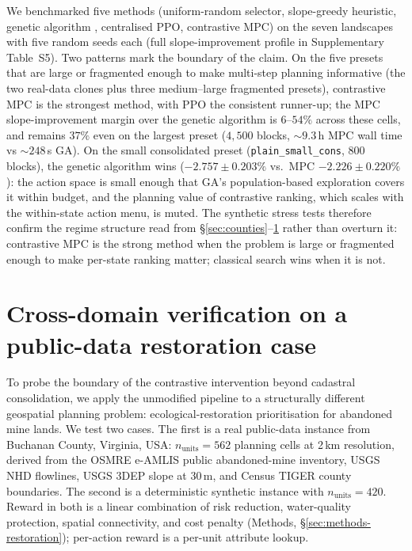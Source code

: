 \documentclass[11pt]{article}
\begin{document}
We benchmarked five methods (uniform-random selector, slope-greedy heuristic, genetic algorithm \citep{cao2012boundary}, centralised PPO, contrastive MPC) on the seven landscapes with five random seeds each (full slope-improvement profile in Supplementary Table~S5). Two patterns mark the boundary of the claim. On the five presets that are large or fragmented enough to make multi-step planning informative (the two real-data clones plus three medium--large fragmented presets), contrastive MPC is the strongest method, with PPO the consistent runner-up; the MPC slope-improvement margin over the genetic algorithm is $6$--$54\%$ across these cells, and remains $37\%$ even on the largest preset ($4{,}500$ blocks, $\sim$$9.3$\,h MPC wall time vs $\sim$$248$\,s GA). On the small consolidated preset (\texttt{plain\_small\_cons}, $800$ blocks), the genetic algorithm wins ($-2.757 \pm 0.203\%$ vs.\ MPC $-2.226 \pm 0.220\%$): the action space is small enough that GA's population-based exploration covers it within budget, and the planning value of contrastive ranking, which scales with the within-state action menu, is muted. The synthetic stress tests therefore confirm the regime structure read from §\ref{sec:counties}--\ref{sec:cross-domain} rather than overturn it: contrastive MPC is the strong method when the problem is large or fragmented enough to make per-state ranking matter; classical search wins when it is not.

\section{Cross-domain verification on a public-data restoration case}\label{sec:cross-domain}

To probe the boundary of the contrastive intervention beyond cadastral consolidation, we apply the unmodified pipeline to a structurally different geospatial planning problem: ecological-restoration prioritisation for abandoned mine lands. We test two cases. The first is a real public-data instance from Buchanan County, Virginia, USA: $n_{\text{units}}=562$ planning cells at 2\,km resolution, derived from the OSMRE e-AMLIS public abandoned-mine inventory, USGS NHD flowlines, USGS 3DEP slope at 30\,m, and Census TIGER county boundaries. The second is a deterministic synthetic instance with $n_{\text{units}}=420$. Reward in both is a linear combination of risk reduction, water-quality protection, spatial connectivity, and cost penalty (Methods, \S\ref{sec:methods-restoration}); per-action reward is a per-unit attribute lookup.
\end{document}
